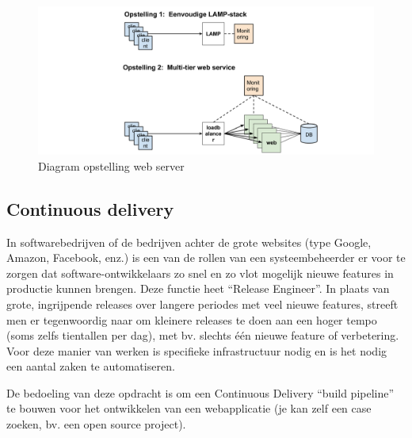 \begin{figure}[htbp]
\centering
\includegraphics[width=\textwidth]{img/assignment-ha.png}
\caption{Diagram opstelling web server}
\end{figure}

\subsection{Continuous delivery}
\label{subs:continuous-delivery}

In softwarebedrijven of de bedrijven achter de grote websites (type Google, Amazon, Facebook, enz.) is een van de rollen van een systeembeheerder er voor te zorgen dat software-ontwikkelaars zo snel en zo vlot mogelijk nieuwe features in productie kunnen brengen. Deze functie heet ``Release Engineer''. In plaats van grote, ingrijpende releases over langere periodes met veel nieuwe features, streeft men er tegenwoordig naar om kleinere releases te doen aan een hoger tempo (soms zelfs tientallen per dag), met bv. slechts één nieuwe feature of verbetering. Voor deze manier van werken is specifieke infrastructuur nodig en is het nodig een aantal zaken te automatiseren.

De bedoeling van deze opdracht is om een Continuous Delivery ``build pipeline'' te bouwen voor het ontwikkelen van een webapplicatie (je kan zelf een case zoeken, bv. een open source project).

